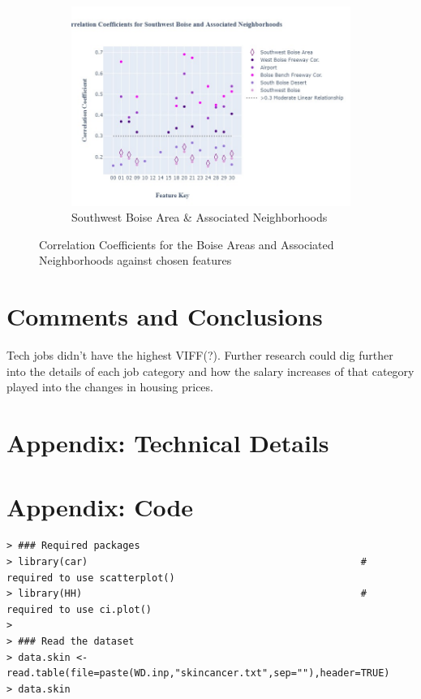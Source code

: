 \documentclass{article}
\begin{document}
\begin{figure}[H]
\begin{subfigure}[b]{0.45\textwidth}
         \includegraphics[width=\textwidth]{images/SW_fig.jpg}
         \caption{Southwest Boise Area \& Associated Neighborhoods}
         \label{fig: sw_ccg}
     \end{subfigure}
        \caption{Correlation Coefficients for the Boise Areas and Associated Neighborhoods against chosen features}
        \label{fig: all_ccg}
\end{figure}


\section{Comments and Conclusions}
Tech jobs didn't have the highest VIFF(?).
Further research could dig further into the details of each job category and how the salary increases of that category played into the changes in housing prices.

\appendix
\section{Appendix: Technical Details}



\section{Appendix: Code}

{\footnotesize
\begin{verbatim}
> ### Required packages
> library(car)                                               # required to use scatterplot()
> library(HH)                                                # required to use ci.plot()
>
> ### Read the dataset
> data.skin <- read.table(file=paste(WD.inp,"skincancer.txt",sep=""),header=TRUE)
> data.skin
\end{verbatim}
}
\end{document}
